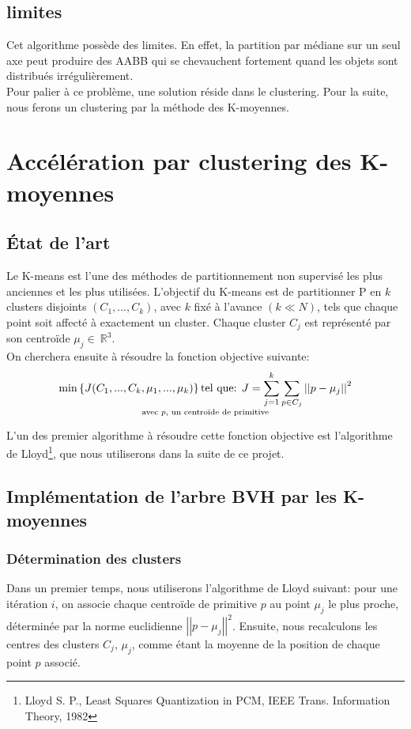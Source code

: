 \subsection{limites}

Cet algorithme possède des limites. En effet,  la partition par médiane sur un seul axe peut produire des AABB qui se chevauchent fortement quand les objets sont distribués irrégulièrement. \\
Pour palier à ce problème, une solution réside dans le clustering. Pour la suite, nous ferons un clustering par la méthode des K-moyennes.

\section{Accélération par clustering des K-moyennes}

\subsection{État de l'art}

Le K-means est l'une des méthodes de partitionnement non supervisé les plus anciennes et les plus utilisées. L'objectif du K-means est de partitionner P en $k$ clusters disjoints $\left(C_1,..., C_k\right)$, avec $k$ fixé à l'avance $\left(k \ll N\right)$, tels que chaque point soit affecté à exactement un cluster. Chaque cluster $C_j$ est représenté par son centroïde $\mu_j \in\ \mathbb{R}^3$.\\
On cherchera ensuite à résoudre la fonction objective suivante:
$$\min\left\{ J(C_1,..., C_k, \mu_1,..., \mu_k) \right\}\text{tel que: }J=\sum_{j=1}^k\sum_{p \in C_j}\left|\left|p-\mu_j\right|\right|^2\atop
\text{avec $p$, un centroïde de primitive}$$

L'un des premier algorithme à résoudre cette fonction objective est l'algorithme de Lloyd\footnote{Lloyd S. P., Least Squares Quantization in PCM, IEEE Trans. Information Theory, 1982}, que nous utiliserons dans la suite de ce projet.

\subsection{Implémentation de l'arbre BVH par les K-moyennes}

\subsubsection{Détermination des clusters}
Dans un premier temps, nous utiliserons l'algorithme de Lloyd suivant: pour une itération $i$, on associe chaque centroïde de primitive $p$ au point $\mu_j$ le plus proche, déterminée par la norme euclidienne $\left|\left|p-\mu_j\right|\right|^2$. Ensuite, nous recalculons les centres des clusters $C_j$, $\mu_j$, comme étant la moyenne de la position de chaque point $p$ associé.\\

